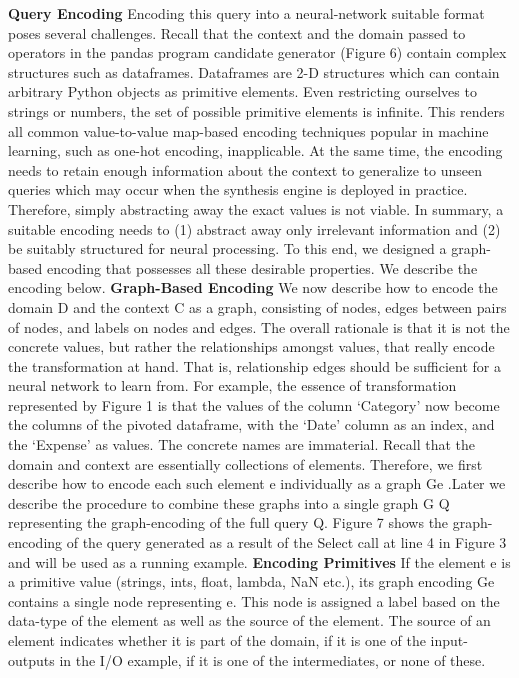 \documentclass{article}
\begin{document}
\textbf{Query Encoding} Encoding this query into a neural-network suitable format poses several challenges. Recall that the context and the domain passed to operators in the pandas program candidate generator (Figure 6) contain complex structures such as dataframes. Dataframes are 2-D structures which can contain arbitrary Python objects as primitive elements. Even restricting ourselves to strings or numbers, the set of possible primitive elements is infinite. This renders all common value-to-value map-based encoding techniques popular in machine learning, such as one-hot encoding, inapplicable. At the same time, the encoding needs to retain enough information about the context to generalize to unseen queries which may occur when the synthesis engine is deployed in practice. Therefore, simply abstracting away the exact values is not viable. In summary, a suitable encoding needs to (1) abstract away only irrelevant information and (2) be suitably structured for neural processing. To this end, we designed a graph-based encoding that possesses all these desirable properties. We describe the encoding below.
\textbf{Graph-Based Encoding} We now describe how to encode the domain D and the context C as a graph, consisting of nodes, edges between pairs of nodes, and labels on nodes and edges. The overall rationale is that it is not the concrete values, but rather the relationships amongst values, that really encode the transformation at hand. That is, relationship edges should be sufficient for a neural network to learn from. For example, the essence of transformation represented by Figure 1 is that the values of the column ‘Category’ now become the columns of the pivoted dataframe, with the ‘Date’ column as an index, and the ‘Expense’ as values. The concrete names are immaterial.
Recall that the domain and context are essentially collections of elements. Therefore, we first describe how to encode each such element e individually as a graph Ge .Later we describe the procedure to combine these graphs into a single graph G Q representing the graph-encoding of the full query Q. Figure 7 shows the graph-encoding of the query generated as a result of the Select call at line 4 in Figure 3 and will be used as a running example.
\textbf{Encoding Primitives} If the element e is a primitive value (strings, ints, float, lambda, NaN etc.), its graph encoding Ge contains a single node representing e. This node is assigned a label based on the data-type of the element as well as the source of the element. The source of an element indicates whether it is part of the domain, if it is one of the input-outputs in the I/O example, if it is one of the intermediates, or none of these.
\end{document}
